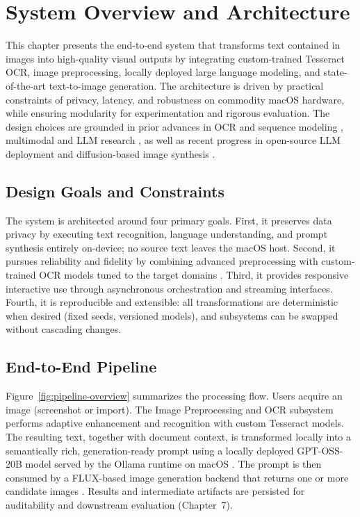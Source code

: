 \chapter{System Overview and Architecture}

This chapter presents the end-to-end system that transforms text contained in images into high-quality visual outputs by integrating custom-trained Tesseract OCR, image preprocessing, locally deployed large language modeling, and state-of-the-art text-to-image generation. The architecture is driven by practical constraints of privacy, latency, and robustness on commodity macOS hardware, while ensuring modularity for experimentation and rigorous evaluation. The design choices are grounded in prior advances in OCR and sequence modeling \cite{smith2007overview, graves2006connectionist, hochreiter1997long}, multimodal and LLM research \cite{qin2024comprehensive, jin2024mm}, as well as recent progress in open-source LLM deployment \cite{openai2025gptoss} and diffusion-based image synthesis \cite{blackforestlabs2024flux, rombach2025flux}.

\section{Design Goals and Constraints}

The system is architected around four primary goals. First, it preserves data privacy by executing text recognition, language understanding, and prompt synthesis entirely on-device; no source text leaves the macOS host. Second, it pursues reliability and fidelity by combining advanced preprocessing with custom-trained OCR models tuned to the target domains \cite{esser2020improving}. Third, it provides responsive interactive use through asynchronous orchestration and streaming interfaces. Fourth, it is reproducible and extensible: all transformations are deterministic when desired (fixed seeds, versioned models), and subsystems can be swapped without cascading changes.

\section{End-to-End Pipeline}

Figure~\ref{fig:pipeline-overview} summarizes the processing flow. Users acquire an image (screenshot or import). The Image Preprocessing and OCR subsystem performs adaptive enhancement and recognition with custom Tesseract models. The resulting text, together with document context, is transformed locally into a semantically rich, generation-ready prompt using a locally deployed GPT-OSS-20B model served by the Ollama runtime on macOS \cite{openai2025gptoss}. The prompt is then consumed by a FLUX-based image generation backend that returns one or more candidate images \cite{blackforestlabs2024flux, rombach2025flux}. Results and intermediate artifacts are persisted for auditability and downstream evaluation (Chapter~7).

